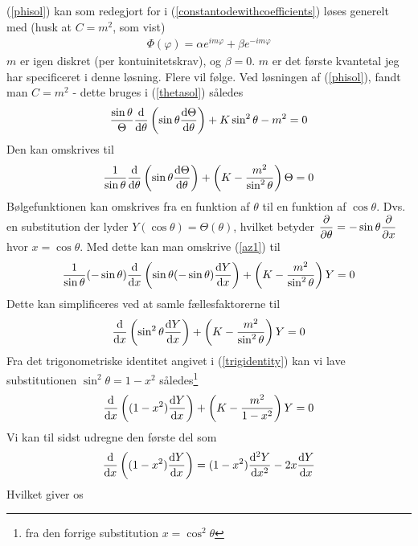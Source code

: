 \documentclass[12pt]{article}
\theoremstyle{definition}
\theoremstyle{remark}
\theoremstyle{definition}
\numberwithin{equation}{section}
\begin{document}
(\ref{phisol}) kan som redegjort for i (\ref{constantodewithcoefficients}) løses generelt med (husk at $C=m^2$, som vist) 
\begin{align}
    \Phi(\varphi) = \alpha e^{im\varphi}+\beta e^{-im\varphi}
\end{align}
$m$ er igen diskret (per kontuinitetskrav), og $\beta=0$. $m$ er det første kvantetal jeg har specificeret i denne løsning. Flere vil følge. Ved løsningen af (\ref{phisol}), fandt man $C=m^2$ - dette bruges i (\ref{thetasol}) således
\begin{align}
    \frac{\sin\theta}{\Theta}\frac{\rm d}{{\rm d}\theta}\left(\sin\theta\frac{{\rm d}\Theta}{{\rm d}\theta}\right)+K\sin^2\theta-m^2=0
\end{align}
Den kan omskrives til
\begin{align}
\label{az1}
    \frac{1}{\sin\theta}\frac{\rm d}{{\rm d}\theta}\left(\sin\theta\frac{{\rm d}\Theta}{{\rm d}\theta}\right)+\left(K-\frac{m^2}{\sin^2\theta}\right)\Theta=0
\end{align}
Bølgefunktionen kan omskrives fra en funktion af $\theta$ til en funktion af $\cos \theta$. Dvs. en substitution der lyder $Y(\cos \theta) = \Theta(\theta)$, hvilket betyder $\displaystyle \pdv{\theta} = -\sin \theta \pdv{x}$ hvor $x=\cos \theta$. Med dette kan man omskrive (\ref{az1}) til
\begin{align}
    \frac{1}{\sin\theta}(-\sin\theta)\frac{\rm d}{{\rm d}x}\left(\sin\theta(-\sin\theta)\frac{{\rm d}Y}{{\rm d}x}\right)+\left(K-\frac{m^2}{\sin^2\theta}\right)Y=0
\end{align}
Dette kan simplificeres ved at samle fællesfaktorerne til
\begin{align}
    \frac{\rm d}{{\rm d}x}\left(\sin^2\theta\frac{{\rm d}Y}{{\rm d}x}\right)+\left(K-\frac{m^2}{\sin^2\theta}\right)Y=0
\end{align}
Fra det trigonometriske identitet angivet i (\ref{trigidentity}) kan vi lave substitutionen $\sin^2\theta = 1-x^2$ således\footnote{fra den forrige substitution $x=\cos^2\theta$}
\begin{align}
    \frac{\rm d}{{\rm d}x}\left((1-x^2)\frac{{\rm d}Y}{{\rm d}x}\right)+\left(K-\frac{m^2}{1-x^2}\right)Y=0
\end{align}
Vi kan til sidst udregne den første del som
\begin{align}
    \frac{\rm d}{{\rm d}x}\left((1-x^2)\frac{{\rm d}Y}{{\rm d}x}\right) = (1-x^2)\frac{{\rm d}^2Y}{{\rm d}x^2}-2x\frac{{\rm d}Y}{{\rm d}x}
\end{align}
Hvilket giver os
\end{document}
